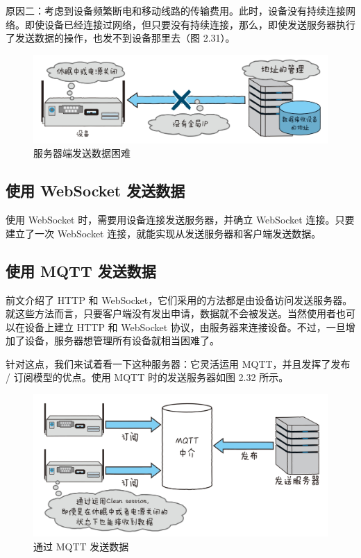 \documentclass[12pt,UTF8]{ctexbook}
\begin{document}
原因二：考虑到设备频繁断电和移动线路的传输费用。此时，设备没有持续连接网络。即使设备已经连接过网络，但只要没有持续连接，那么，即使发送服务器执行了发送数据的操作，也发不到设备那里去（图 2.31）。

\begin{figure}[htbp]
	\centering
	\includegraphics[width=1\linewidth]{50}
	\caption{服务器端发送数据困难}
	\label{fig:1}
\end{figure}

\subsection{使用 WebSocket 发送数据}

使用 WebSocket 时，需要用设备连接发送服务器，并确立 WebSocket 连接。只要建立了一次 WebSocket 连接，就能实现从发送服务器和客户端发送数据。

\subsection{使用 MQTT 发送数据}

前文介绍了 HTTP 和 WebSocket，它们采用的方法都是由设备访问发送服务器。就这些方法而言，只要客户端没有发出申请，数据就不会被发送。当然使用者也可以在设备上建立 HTTP 和 WebSocket 协议，由服务器来连接设备。不过，一旦增加了设备，服务器想管理所有设备就相当困难了。

针对这点，我们来试着看一下这种服务器：它灵活运用 MQTT，并且发挥了发布 / 订阅模型的优点。使用 MQTT 时的发送服务器如图 2.32 所示。

\begin{figure}[htbp]
	\centering
	\includegraphics[width=1\linewidth]{51}
	\caption{通过 MQTT 发送数据}
	\label{fig:1}
\end{figure}
\end{document}
